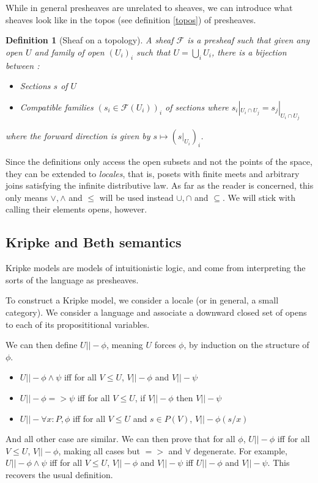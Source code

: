 \documentclass[11pt]{article}
\newtheorem{definition}[theorem]{Definition}
\newcommand{\0}{\mathbf{0}}
\newcommand{\1}{\mathbf{1}}
\begin{document}
While in general presheaves are unrelated to sheaves, we can introduce what sheaves look like in the topos (see definition \ref{topos}) of presheaves.

\begin{definition}[Sheaf on a topology]
    A \emph{sheaf} $\mathcal{F}$ is a presheaf such that given any open  $U$ and family of open $(U_i)_i$ such that $U = \bigcup_i U_i$, there is a bijection between :
    \begin{itemize}
        \item Sections $s$ of $U$
        \item \emph{Compatible} families $(s_i\in \mathcal{F}(U_i))_i$ of sections where $s_i|_{U_i\cap U_j} = s_j|_{U_i\cap U_j}$
    \end{itemize}
    where the forward direction is given by $s \mapsto (s|_{U_i})_i$.
\end{definition}

Since the definitions only access the open subsets and not the points of the space, they can be extended to \emph{locales}, that is, posets with finite meets and arbitrary joins satisfying the infinite distributive law. As far as the reader is concerned, this only means $\vee,\wedge$ and $\leq$ will be used instead $\cup,\cap$ and $\subseteq$. We will stick with calling their elements opens, however.

\subsection{Kripke and Beth semantics}

Kripke models are models of intuitionistic logic, and come from interpreting the sorts of the language as presheaves.

To construct a Kripke model, we consider a locale (or in general, a small category). We consider a language and associate a downward closed set of opens to each of its proposititional variables.

We can then define $U ||- \phi$, meaning $U$ forces $\phi$, by induction on the structure of $\phi$.
\begin{itemize}
    \item $U ||- \phi \wedge \psi$ iff for all $V\leq U$, $V ||- \phi$ and $V ||- \psi$
    \item $U ||- \phi => \psi$ iff for all $V \leq U$, if $V ||- \phi$ then $V ||- \psi $
    \item $U ||- \forall x : P, \phi$ iff for all $V \leq U$ and $s\in P(V)$, $V ||- \phi(s/x) $
\end{itemize}
And all other case are similar. We can then prove that for all $\phi$, $U||-\phi$ iff for all $V \leq U$, $V ||- \phi$, making all cases but $ => $ and $\forall$ degenerate. For example, $U ||- \phi \wedge \psi$ iff for all $V \leq U$, $ V||- \phi$ and $V ||- \psi$ iff $U||- \phi$ and $V||- \psi$. This recovers the usual definition.
\end{document}
